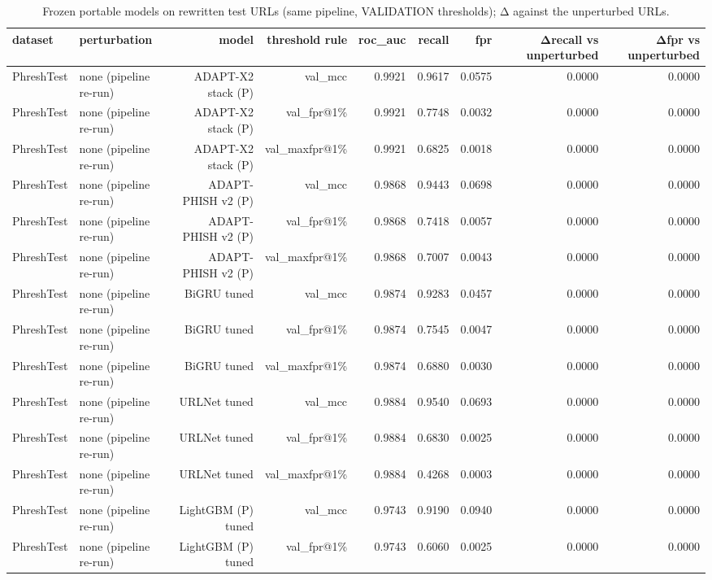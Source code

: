 \begin{table}[t]
\centering
\scriptsize
\caption{Frozen portable models on rewritten test URLs (same pipeline, VALIDATION thresholds); Δ against the unperturbed URLs.}
\label{tab:rev_R16_obfuscation_idn_robustness}
\begin{tabular}{llrrrrrrr}
\toprule
dataset & perturbation & model & threshold rule & roc\_auc & recall & fpr & Δrecall vs unperturbed & Δfpr vs unperturbed \\
\midrule
PhreshTest & none (pipeline re-run) & ADAPT-X2 stack (P) & val\_mcc & 0.9921 & 0.9617 & 0.0575 & 0.0000 & 0.0000 \\
PhreshTest & none (pipeline re-run) & ADAPT-X2 stack (P) & val\_fpr@1\% & 0.9921 & 0.7748 & 0.0032 & 0.0000 & 0.0000 \\
PhreshTest & none (pipeline re-run) & ADAPT-X2 stack (P) & val\_maxfpr@1\% & 0.9921 & 0.6825 & 0.0018 & 0.0000 & 0.0000 \\
PhreshTest & none (pipeline re-run) & ADAPT-PHISH v2 (P) & val\_mcc & 0.9868 & 0.9443 & 0.0698 & 0.0000 & 0.0000 \\
PhreshTest & none (pipeline re-run) & ADAPT-PHISH v2 (P) & val\_fpr@1\% & 0.9868 & 0.7418 & 0.0057 & 0.0000 & 0.0000 \\
PhreshTest & none (pipeline re-run) & ADAPT-PHISH v2 (P) & val\_maxfpr@1\% & 0.9868 & 0.7007 & 0.0043 & 0.0000 & 0.0000 \\
PhreshTest & none (pipeline re-run) & BiGRU tuned & val\_mcc & 0.9874 & 0.9283 & 0.0457 & 0.0000 & 0.0000 \\
PhreshTest & none (pipeline re-run) & BiGRU tuned & val\_fpr@1\% & 0.9874 & 0.7545 & 0.0047 & 0.0000 & 0.0000 \\
PhreshTest & none (pipeline re-run) & BiGRU tuned & val\_maxfpr@1\% & 0.9874 & 0.6880 & 0.0030 & 0.0000 & 0.0000 \\
PhreshTest & none (pipeline re-run) & URLNet tuned & val\_mcc & 0.9884 & 0.9540 & 0.0693 & 0.0000 & 0.0000 \\
PhreshTest & none (pipeline re-run) & URLNet tuned & val\_fpr@1\% & 0.9884 & 0.6830 & 0.0025 & 0.0000 & 0.0000 \\
PhreshTest & none (pipeline re-run) & URLNet tuned & val\_maxfpr@1\% & 0.9884 & 0.4268 & 0.0003 & 0.0000 & 0.0000 \\
PhreshTest & none (pipeline re-run) & LightGBM (P) tuned & val\_mcc & 0.9743 & 0.9190 & 0.0940 & 0.0000 & 0.0000 \\
PhreshTest & none (pipeline re-run) & LightGBM (P) tuned & val\_fpr@1\% & 0.9743 & 0.6060 & 0.0025 & 0.0000 & 0.0000 \\

\end{tabular}
\end{table}
